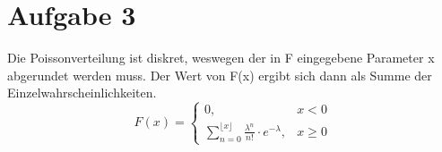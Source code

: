 \documentclass[10pt,a4paper]{article}
\begin{document}
\section*{Aufgabe 3}
Die Poissonverteilung ist diskret, weswegen der in F eingegebene Parameter x abgerundet werden muss. Der Wert von F(x) ergibt sich dann als Summe der Einzelwahrscheinlichkeiten.
$$F(x)=\left\{\begin{array}{cl} 0, & x < 0\\ 
\sum_{n=0}^{\lfloor x \rfloor}\frac{\lambda^n}{n!} \cdot e^{-\lambda}, & x \geq 0  \end{array}\right.$$
\end{document}
